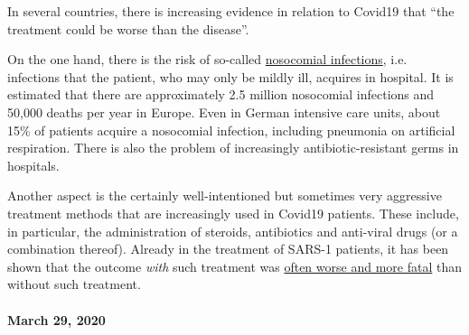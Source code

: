 In several countries, there is increasing evidence in relation to
Covid19 that ``the treatment could be worse than the disease''.

On the one hand, there is the risk of so-called
\href{https://en.wikipedia.org/wiki/Hospital-acquired_infection}{nosocomial
infections}, i.e. infections that the patient, who may only be mildly
ill, acquires in hospital. It is estimated that there are approximately
2.5 million nosocomial infections and 50,000 deaths per year in Europe.
Even in German intensive care units, about 15\% of patients acquire a
nosocomial infection, including pneumonia on artificial respiration.
There is also the problem of increasingly antibiotic-resistant germs in
hospitals.

Another aspect is the certainly well-intentioned but sometimes very
aggressive treatment methods that are increasingly used in Covid19
patients. These include, in particular, the administration of steroids,
antibiotics and anti-viral drugs (or a combination thereof). Already in
the treatment of SARS-1 patients, it has been shown that the outcome
\emph{with} such treatment was
\href{https://www.sciencedaily.com/releases/2020/02/200206110703.htm}{often
worse and more fatal} than without such treatment.

\hypertarget{march-29-2020}{%
\paragraph{March 29, 2020}\label{march-29-2020}}

